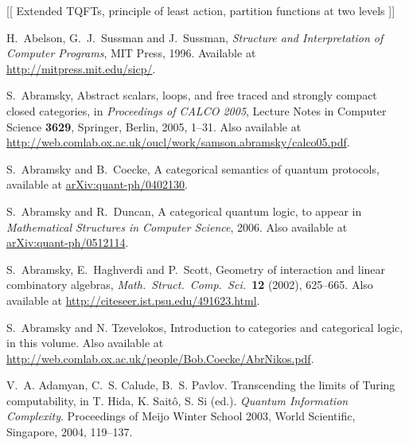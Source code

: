 \documentclass[12pt,twoside,openright]{report}
\begin{document}
[[ Extended TQFTs, principle of least action, partition functions at two levels ]]

\begin{thebibliography}{99}

\newcommand{\quantph}[1]{\href{http://arxiv.org/abs/quant-ph/#1}{{ arXiv:quant-ph/#1}}}
\newcommand{\hepth}[1]{\href{http://arxiv.org/abs/hep-th/#1}{{ arXiv:hep-th/#1}}}
\newcommand{\grqc}[1]{\href{http://arxiv.org/abs/gr-qc/#1}{{ arXiv:gr-qc/#1}}}
\newcommand{\qalg}[1]{\href{http://arxiv.org/abs/q-alg/#1}{{ arXiv:q-alg/#1}}}
\newcommand{\mathph}[1]{\href{http://arxiv.org/abs/math-ph/#1}{{ arXiv:math-ph/#1}}}
\newcommand{\Math}[1]{\href{http://arxiv.org/abs/math/#1}{{ arXiv:math/#1}}}
\newcommand{\arxiv}[1]{\href{http://arxiv.org/abs/#1}{{ arXiv:#1}}}

 H.\ Abelson, G.\ J.\ Sussman and J.\
Sussman, {\sl Structure and Interpretation of Computer Programs}, MIT Press, 1996.  Available at \href{http://mitpress.mit.edu/sicp/}{{ http://mitpress.mit.edu/sicp/}}.

S.\ Abramsky, Abstract scalars, loops, and free traced and strongly compact closed categories, in {\sl Proceedings of CALCO 2005}, Lecture Notes in Computer Science {\bf 3629}, Springer, Berlin,
2005, 1--31. Also available at \hfill \break 
\href{http://web.comlab.ox.ac.uk/oucl/work/samson.abramsky/calco05.pdf}{ http://web.comlab.ox.ac.uk/oucl/work/samson.abramsky/calco05.pdf}.

 S.\ Abramsky and B.\ Coecke, A categorical semantics of quantum protocols, available at \quantph{0402130}.

S.\ Abramsky and R.\ Duncan, A categorical quantum logic, to appear in {\sl Mathematical Structures in Computer Science}, 2006. Also available at \quantph{0512114}.

 S.\ Abramsky, E.\ Haghverdi and P.\ Scott, Geometry of interaction and linear combinatory algebras, 
{\sl Math.\ Struct.\ Comp.\ Sci.\ }{\bf 12} (2002), 625--665.  Also available at \hfill \break
\href{http://citeseer.ist.psu.edu/491623.html}{ http://citeseer.ist.psu.edu/491623.html}.

 S.\ Abramsky and N. Tzevelokos, Introduction to categories and categorical logic, in this volume.  Also available at
\href{http://web.comlab.ox.ac.uk/people/Bob.Coecke/AbrNikos.pdf}{ http://web.comlab.ox.ac.uk/people/Bob.Coecke/AbrNikos.pdf}.

 V.~A. Adamyan, C.~S. Calude, B.~S. Pavlov. Transcending the limits of Turing computability, in T. Hida, K. Sait\^o, S. Si  (ed.). \emph{Quantum Information Complexity}. Proceedings of Meijo Winter School 2003, World Scientific, Singapore, 2004, 119--137.


\end{thebibliography}
\end{document}
